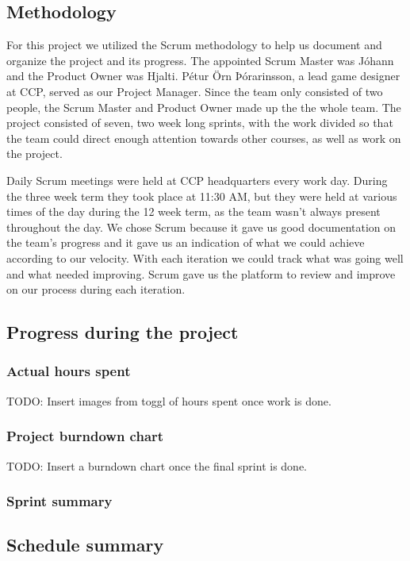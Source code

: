 \subsection{Methodology}
For this project we utilized the Scrum methodology to help us document and organize the project and its progress. The appointed Scrum Master was Jóhann and the Product Owner was Hjalti. Pétur Örn Þórarinsson, a lead game designer at CCP, served as our Project Manager. Since the team only consisted of two people, the Scrum Master and Product Owner made up the the whole team. The project consisted of seven, two week long sprints, with the work divided so that the team could direct enough attention towards other courses, as well as work on the project.

Daily Scrum meetings were held at CCP headquarters every work day. During the three week term they took place at 11:30 AM, but they were held at various times of the day during the 12 week term, as the team wasn't always present throughout the day. We chose Scrum because it gave us good documentation on the team's progress and it gave us an indication of what we could achieve according to our velocity. With each iteration we could track what was going well and what needed improving. Scrum gave us the platform to review and improve on our process during each iteration.

\subsection{Progress during the project}

\subsubsection{Actual hours spent}

TODO: Insert images from toggl of hours spent once work is done.

\subsubsection{Project burndown chart}

TODO: Insert a burndown chart once the final sprint is done.

\subsubsection{Sprint summary}

\subsection{Schedule summary}